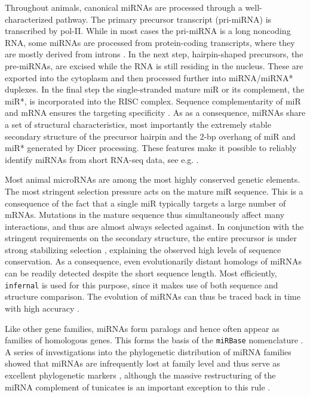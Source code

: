 \documentclass[graybox]{svmult}
\begin{document}
Throughout animals, canonical miRNAs are processed through a
well-characterized pathway. The primary precursor transcript (pri-miRNA) is
transcribed by pol-II. While in most cases the pri-miRNA is a long
noncoding RNA, some miRNAs are processed from protein-coding transcripts,
where they are mostly derived from introns \citep{Lin:06}. In the next step,
hairpin-shaped precursors, the pre-miRNAs, are excised while the RNA is
still residing in the nucleus. These are exported into the cytoplasm
\citep{Lund:04} and then processed further into miRNA/miRNA* duplexes. In
the final step the single-stranded mature miR or its complement, the miR*,
is incorporated into the RISC complex. Sequence complementarity of miR and mRNA
ensures the targeting specificity \citep{Bartel:13}. As as a consequence,
miRNAs share a set of structural characteristics, most importantly the
extremely stable secondary structure of the precursor hairpin and the 2-bp
overhang of miR and miR* generated by Dicer processing. These features make
it possible to reliably identify miRNAs from short RNA-seq data, see e.g.
\citep{Langenberger:10a, Friedlaender:12, Langenberger:13a}.

Most animal microRNAs are among the most highly conserved genetic elements.
The most stringent selection pressure acts on the mature miR sequence. This
is a consequence of the fact that a single miR typically targets a large
number of mRNAs. Mutations in the mature sequence thus simultaneously affect
many interactions, and thus are almost always selected against. In
conjunction with the stringent requirements on the secondary structure, the
entire precursor is under strong stabilizing selection \citep{Price:11},
explaining the observed high levels of sequence conservation. As a
consequence, even evolutionarily distant homologs of miRNAs can be readily
detected despite the short sequence length. Most efficiently,
\texttt{infernal} \citep{Nawrocki:13} is used for this purpose, since it
makes use of both sequence and structure comparison. The evolution of
miRNAs can thus be traced back in time with high accuracy \citep{Hertel:06a}. 

Like other gene families, miRNAs form paralogs \citep{Tanzer:04a, Hertel:12a}
and hence often appear as families of homologous genes. This forms the
basis of the \texttt{miRBase} nomenclature \citep{Ambrose:03a}. A series of
investigations into the phylogenetic distribution of miRNA families showed
that miRNAs are infrequently lost at family level and thus serve as
excellent phylogenetic markers \citep{Sempere:06, Heimberg:08, Heimberg:10, 
Wheeler:09}, although the massive restructuring of the miRNA complement of 
tunicates is an important exception to this rule \citep{Fu:08}.
\end{document}
